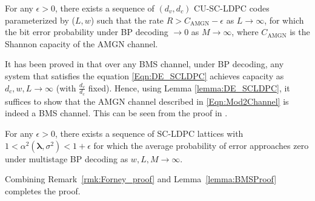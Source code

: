 \documentclass[conference]{IEEEtran}
\begin{document}
\begin{lemma}\label{lemma:BMSProof}
For any $\epsilon>0$, there exists a sequence of $(d_{v},d_{c})$ CU-SC-LDPC codes parameterized by ($L,w$) such that the rate $R>C_{\text{AMGN}}-\epsilon$ as $L \rightarrow \infty$, for which the bit error probability under BP decoding $\rightarrow 0$  as $M\rightarrow \infty$, where $C_{\text{AMGN}}$ is the Shannon capacity of the AMGN channel.
\end{lemma}
\begin{IEEEproof}
It has been proved in \cite{kudekaruniversal,kumar2012proof} that over any BMS channel, under BP decoding, any system that satisfies the equation \eqref{Eqn:DE_SCLDPC} achieves capacity as $d_{c},w,L \rightarrow \infty$ (with $\frac{d_{v}}{d_{c}}$ fixed). Hence, using Lemma \ref{lemma:DE_SCLDPC}, it suffices to show that the AMGN channel described in \eqref{Eqn:Mod2Channel} is indeed a BMS channel. This can be seen from the proof in \cite{YanLingWu13}.
\end{IEEEproof}

\begin{theorem}\label{thm:poltyrev_good}
   For any $\epsilon>0$, there exists a sequence of SC-LDPC lattices with $1<\alpha^2(\boldsymbol\lambda,\sigma^2)<1+\epsilon$ for which the average probability of error approaches zero under multistage BP decoding as $w,L, M \rightarrow \infty$.
\end{theorem}
\begin{IEEEproof}
    Combining Remark~\ref{rmk:Forney_proof} and Lemma~\ref{lemma:BMSProof} completes the proof.
\end{IEEEproof}
\end{document}
